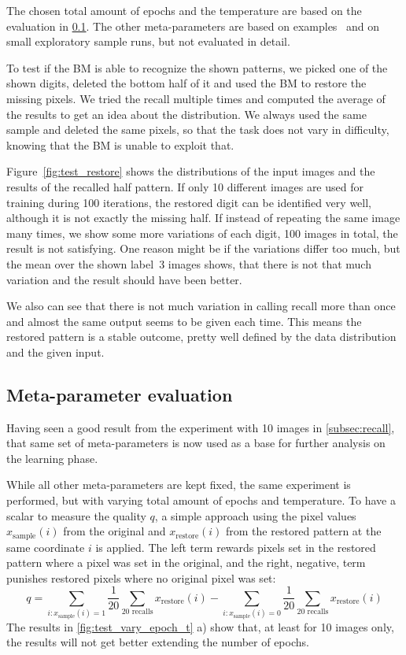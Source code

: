 \documentclass[12pt,twoside]{article}
\theoremstyle{plain}
\theoremstyle{definition}
\theoremstyle{remark}
\begin{document}
The chosen total amount of epochs and the temperature are based on the evaluation in \cref{subsec:meta}. The other meta-parameters are based on examples~\cite{BMImpl} and on small exploratory sample runs, but not evaluated in detail.

To test if the BM is able to recognize the shown patterns, we picked one of the shown digits, deleted the bottom half of it and used the BM to restore the missing pixels. We tried the recall multiple times and computed the average of the results to get an idea about the distribution. We always used the same sample and deleted the same pixels, so that the task does not vary in difficulty, knowing that the BM is unable to exploit that.

Figure~\ref{fig:test_restore} shows the distributions of the input images and the results of the recalled half pattern. 
If only 10 different images are used for training during 100 iterations, the restored digit can be identified very well, although it is not exactly the missing half.
If instead of repeating the same image many times, we show some more variations of each digit, 100 images in total, the result is not satisfying.
One reason might be if the variations differ too much, but the mean over the shown label~3 images shows, that there is not that much variation and the result should have been better.

We also can see that there is not much variation in calling recall more than once and almost the same output seems to be given each time. This means the restored pattern is a stable outcome, pretty well defined by the data distribution and the given input.


\subsection{Meta-parameter evaluation}
\label{subsec:meta}

Having seen a good result from the experiment with 10 images in \cref{subsec:recall}, that same set of meta-parameters is now used as a base for further analysis on the learning phase.

While all other meta-parameters are kept fixed, the same experiment is performed, but with varying total amount of epochs and temperature.
To have a scalar to measure the quality $q$, a simple approach using the pixel values $x_\text{sample}(i)$ from the original and $x_\text{restore}(i)$ from the restored pattern at the same coordinate $i$ is applied.
The left term rewards pixels set in the restored pattern where a pixel was set in the original, and the right, negative, term punishes restored pixels where no original pixel was set:
$$q = \sum_{i : x_\text{sample}(i) = 1} \frac1{20}\sum_{\text{20 recalls}}x_\text{restore}(i) - \sum_{i : x_\text{sample}(i) = 0} \frac1{20}\sum_{\text{20 recalls}}x_\text{restore}(i)$$
The results in \cref{fig:test_vary_epoch_t} a) show that, at least for 10 images only, the results will not get better extending the number of epochs.
\end{document}

